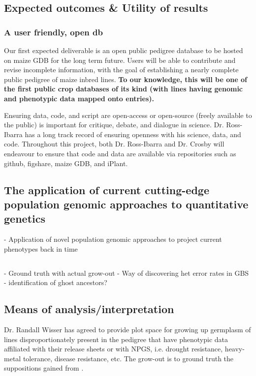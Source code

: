 \documentclass[12pt]{article}
\begin{document}
\subsection*{Expected outcomes \& Utility of results}

\subsubsection*{A user friendly, open db}

Our first expected deliverable is an open public pedigree database to be hosted on maize GDB for the long term future. Users will be able to contribute and revise incomplete information, with the goal of establishing a nearly complete public pedigree of maize inbred lines. \textbf{To our knowledge, this will be one of the first public crop databases of its kind (with lines having genomic and phenotypic data mapped onto entries).}
\par Ensuring data, code, and script are open-access or open-source (freely available to the public) is important for critique, debate, and dialogue in science. Dr. Ross-Ibarra has a long track record of ensuring openness with his science, data, and code. Throughout this project, both Dr. Ross-Ibarra and Dr. Crosby will endeavour to ensure that code and data are available via repositories such as github, figshare, maize GDB, and iPlant.

\subsection*{The application of current cutting-edge population genomic approaches to quantitative genetics}

- Application of novel population genomic approaches to project current phenotypes back in time

\subsection*{}
- Ground truth with actual grow-out
- Way of discovering het error rates in GBS
- identification of ghost ancestors?

\subsection*{Means of analysis/interpretation}
Dr. Randall Wisser has agreed to provide plot space for growing up germplasm of lines disproportionately present in the pedigree that have phenotypic data affiliated with their release sheets or with NPGS, i.e. drought resistance, heavy-metal tolerance, disease resistance, etc. The grow-out is to ground truth the suppositions gained from \citep{Berg:2014bs}.
\end{document}
